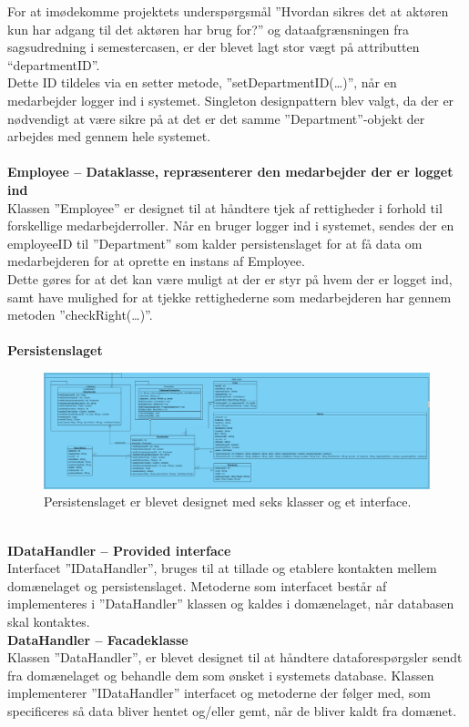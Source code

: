 For at imødekomme projektets underspørgsmål ”Hvordan sikres det at aktøren kun har adgang til det aktøren har brug for?” og dataafgrænsningen fra sagsudredning i semestercasen, er der blevet lagt stor vægt på attributten “departmentID”. \\
Dette ID tildeles via en setter metode, ”setDepartmentID(…)”, når en medarbejder logger ind i systemet. Singleton designpattern blev valgt, da der er nødvendigt at være sikre på at det er det samme ”Department”-objekt der arbejdes med gennem hele systemet.\\\\
\textbf{Employee – Dataklasse, repræsenterer den medarbejder der er logget ind}\\
Klassen ”Employee” er designet til at håndtere tjek af rettigheder i forhold til forskellige medarbejderroller. Når en bruger logger ind i systemet, sendes der en employeeID til ”Department” som kalder persistenslaget for at få data om medarbejderen for at oprette en instans af Employee.\\
Dette gøres for at det kan være muligt at der er styr på hvem der er logget ind, samt have mulighed for at tjekke rettighederne som medarbejderen har gennem metoden ”checkRight(…)”.\\ \\
\textbf{Persistenslaget}
\begin{figure}[htb!]
  \includegraphics[width = \linewidth]{./PNG/design/datalagKlassediagram.PNG} 
  \caption{Persistenslaget er blevet designet med seks klasser og et interface.}
  \label{fig:2dataklassediagram}
\end{figure}
\\ 
\textbf{IDataHandler – Provided interface} \\
Interfacet ”IDataHandler”, bruges til at tillade og etablere kontakten mellem domænelaget og persistenslaget. Metoderne som interfacet består af implementeres i ”DataHandler” klassen og kaldes i domænelaget, når databasen skal kontaktes.\\
\textbf{DataHandler – Facadeklasse}\\
Klassen ”DataHandler”, er blevet designet til at håndtere dataforespørgsler sendt fra domænelaget og behandle dem som ønsket i systemets database. Klassen implementerer ”IDataHandler” interfacet og metoderne der følger med, som specificeres så data bliver hentet og/eller gemt, når de bliver kaldt fra domænet.\\
